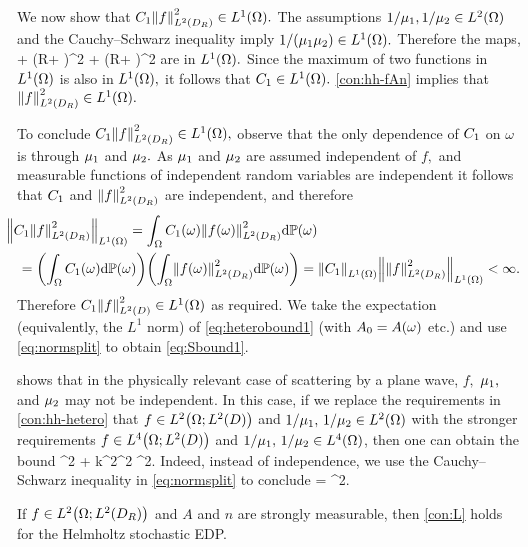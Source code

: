 We now show that $\Co\NLtDR{f}^2 \in \LoO.$ The assumptions $1/\muo,1/\mut \in \LtO$ and the Cauchy--Schwarz inequality imply $1/(\muo\mut) \in \LoO.$ Therefore the maps,
\beqs\omega \mapsto {} + \left(R+ \right)^2  \omega \mapsto {} + \left(R+ \right)^2
\eeqs
are in $\LoO.$ Since the maximum of two functions in $\LoO$ is also in $\LoO,$ it follows that $\Co \in \LoO.$ \cref{con:hh-fAn} implies that $\NLtDR{f}^2 \in \LoO.$

To conclude $\Co\NLtDR{f}^2 \in \LoO,$ observe that the only dependence of $C_{1}$ on $\omega$ is through $\mu_{1}$ and $\mu_{2}.$ As $\mu_{1}$ and $\mu_{2}$ are assumed independent of $f,$ and measurable functions of independent random variables are independent \cite[p.236]{Lo:77} it follows that $C_{1}$ and $\NLtDR{f}^2$ are independent, and therefore
\begin{align}\nonumber
&\hspace{-2ex}\NLoO{\Co\NLtDR{f}^2} = \int_\Omega \Co(\omega) \NLtDR{f(\omega)}^2 \dd\PP(\omega) 
\\ &= \mleft(\int_\Omega \Co(\omega) \dd\PP(\omega)\mright)\mleft(\int_\Omega \NLtDR{f(\omega)}^2 \dd\PP(\omega)\mright)= \NLoO{\Co}\NLoO{\NLtDR{f}^2} < \infty.\label{eq:normsplit}
\end{align}
Therefore $\Co\NLtD{f}^2 \in \LoO$ as required. We take the expectation (equivalently, the $L^1$ norm) of \eqref{eq:heterobound1} (with $A_{0} = A(\omega)$ etc.) and use \eqref{eq:normsplit} to obtain \eqref{eq:Sbound1}.
\epf

\label{rem:notindep}
 shows that in the physically relevant case of scattering by a plane wave, $f,$ $\mu_{1},$ and $\mu_{2}$ may not be independent. In this case, if we replace the requirements in \cref{con:hh-hetero} that $f \in \LtOLtD$ and $1/\muo,\,1/\mut \in \LtO$ with the stronger requirements $f \in \LfOLtD$ and $1/\muo,\,1/\mut \in \LfO$, then one can obtain the bound
\beqs
{}^2 + k^2^2\leq \NLtO{\Co} ^2.
\eeqs
Indeed, instead of independence, we use the Cauchy--Schwarz inequality in \eqref{eq:normsplit} to conclude
\beqs
{}  \leq \NLtO{\Co} = \NLtO{\Co} ^2.
\eeqs
\ere

\label{lem:hh-L}
If $f \in \LtOLtDR$ and $A$ and $n$ are strongly measurable, then \cref{con:L} holds for the Helmholtz stochastic EDP.
\ele

